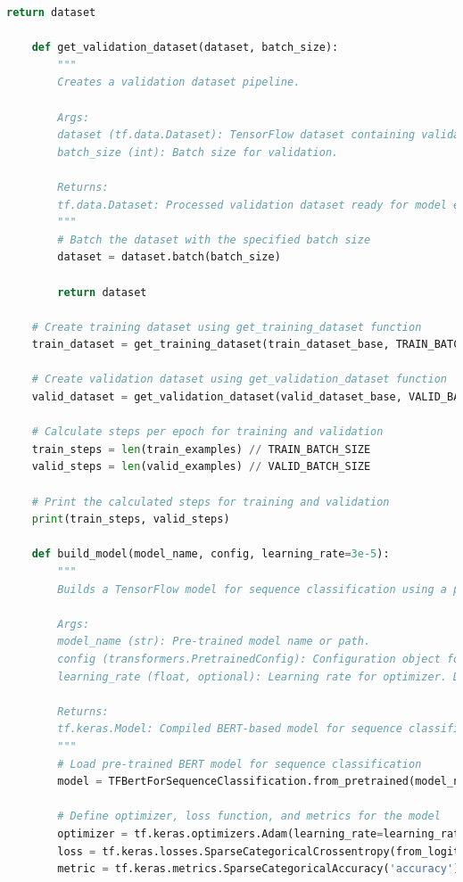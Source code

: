 \documentclass{solutionclass} %
\begin{document}
\begin{solution}
\begin{lstlisting}[language=Python, basicstyle=\ttfamily\footnotesize, keywordstyle=\color{blue}, commentstyle=\color{gray}]
        return dataset
    
    def get_validation_dataset(dataset, batch_size):
        """
        Creates a validation dataset pipeline.
    
        Args:
        dataset (tf.data.Dataset): TensorFlow dataset containing validation examples.
        batch_size (int): Batch size for validation.
    
        Returns:
        tf.data.Dataset: Processed validation dataset ready for model evaluation.
        """
        # Batch the dataset with the specified batch size
        dataset = dataset.batch(batch_size)
    
        return dataset
    
    # Create training dataset using get_training_dataset function
    train_dataset = get_training_dataset(train_dataset_base, TRAIN_BATCH_SIZE)
    
    # Create validation dataset using get_validation_dataset function
    valid_dataset = get_validation_dataset(valid_dataset_base, VALID_BATCH_SIZE)
    
    # Calculate steps per epoch for training and validation
    train_steps = len(train_examples) // TRAIN_BATCH_SIZE
    valid_steps = len(valid_examples) // VALID_BATCH_SIZE
    
    # Print the calculated steps for training and validation
    print(train_steps, valid_steps)
    
    def build_model(model_name, config, learning_rate=3e-5):
        """
        Builds a TensorFlow model for sequence classification using a pre-trained BERT model.
    
        Args:
        model_name (str): Pre-trained model name or path.
        config (transformers.PretrainedConfig): Configuration object for the BERT model.
        learning_rate (float, optional): Learning rate for optimizer. Default is 3e-5.
    
        Returns:
        tf.keras.Model: Compiled BERT-based model for sequence classification.
        """
        # Load pre-trained BERT model for sequence classification
        model = TFBertForSequenceClassification.from_pretrained(model_name, force_download=True, config=config)
    
        # Define optimizer, loss function, and metrics for the model
        optimizer = tf.keras.optimizers.Adam(learning_rate=learning_rate)
        loss = tf.keras.losses.SparseCategoricalCrossentropy(from_logits=True)
        metric = tf.keras.metrics.SparseCategoricalAccuracy('accuracy')
    

\end{lstlisting}
\end{solution}
\end{document}

